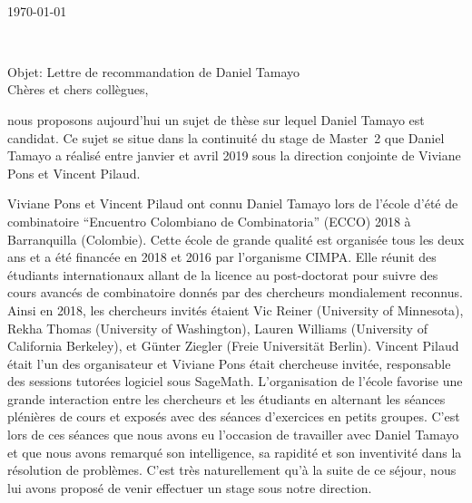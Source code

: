 \documentclass[11pt,a4paper]{letter} %
\def\opening#1{\thispagestyle{empty}
{\centering\fromaddress \vspace{1in} \\ %
\today\hspace*{\fill}\par} %
{\raggedright \toname \\ \toaddress \par} %
\vspace{0.4in} %
\noindent #1 %
}
\begin{document}

\begin{letter}
{
}


\opening{Objet: Lettre de recommandation de Daniel Tamayo\\[.5cm]
  Chères et chers collègues,}

nous proposons aujourd'hui un sujet de thèse sur lequel Daniel Tamayo est candidat. Ce sujet se situe dans
la continuité du stage de Master~2 que Daniel Tamayo a réalisé entre janvier et avril 2019 sous la direction conjointe de Viviane Pons et Vincent Pilaud.
\bigskip

Viviane Pons et Vincent Pilaud ont connu Daniel Tamayo lors de l'école d'été de combinatoire ``Encuentro Colombiano de Combinatoria'' (ECCO) 2018 à Barranquilla (Colombie). Cette école de grande qualité est organisée tous les deux ans et a été financée en 2018 et 2016 par l'organisme CIMPA. Elle réunit des étudiants internationaux allant de la licence au post-doctorat pour suivre des cours avancés de combinatoire donnés par des chercheurs mondialement reconnus. Ainsi en 2018, les chercheurs invités étaient Vic Reiner  (University of Minnesota), Rekha Thomas (University of Washington), Lauren Williams (University of California Berkeley), et Günter Ziegler (Freie Universität Berlin). Vincent Pilaud était l'un des organisateur et Viviane Pons était chercheuse invitée, responsable des sessions tutorées logiciel sous SageMath. L'organisation de l'école favorise une grande interaction entre les chercheurs et les étudiants en alternant les séances plénières de cours et exposés avec des séances d'exercices en petits groupes. C'est lors de ces séances que nous avons eu l'occasion de travailler avec Daniel Tamayo et que nous avons remarqué son intelligence, sa rapidité et son inventivité dans la résolution de problèmes. C'est très naturellement qu'à la suite de ce séjour, nous lui avons proposé de venir effectuer un stage sous notre direction.


\end{letter}
\end{document}
